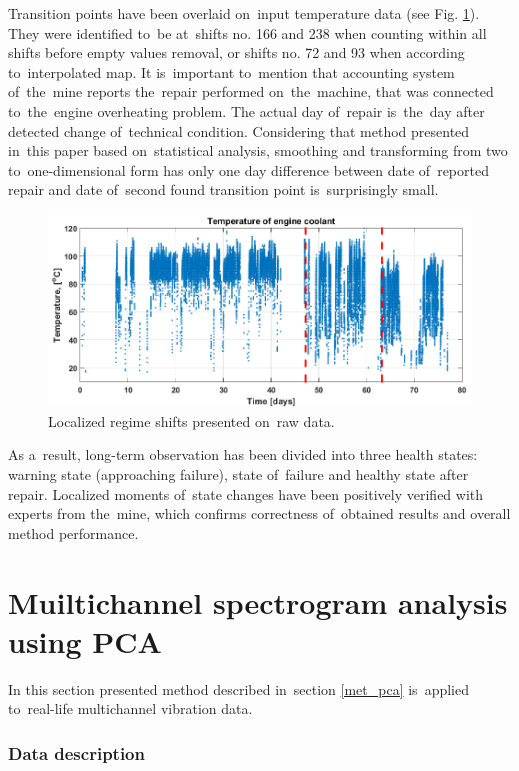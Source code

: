 Transition points have been overlaid on~input temperature data (see Fig. \ref{fig: AD_final}). They were identified to~be at~shifts no. 166 and 238 when counting within all shifts before empty values removal, or shifts no. 72 and 93 when according to~interpolated map. It is~important to~mention that accounting system of~the~mine reports the~repair performed on~the~machine, that was connected to~the~engine overheating problem. The actual day of~repair is~the~day after detected change of~technical condition. Considering that method presented in~this paper based on~statistical analysis, smoothing and transforming from two to~one-dimensional form has only one day difference between date of~reported repair and date of~second found transition point is~surprisingly small.

\begin{figure}[ht!]
\centering
\includegraphics[width = \textwidth]{wykresy/ks_final.png}
\caption{Localized regime shifts presented on~raw data.}
\label{fig: AD_final}
\end{figure}

As a~result, long-term observation has been divided into three health states: warning state (approaching failure), state of~failure and healthy state after repair. Localized moments of~state changes have been positively verified with experts from the~mine, which confirms correctness of~obtained results and overall method performance.


\clearpage
\section{Muiltichannel spectrogram analysis using PCA}\label{result_pca}

In this section presented method described in~section \ref{met_pca} is~applied to~real-life multichannel vibration data.

\subsubsection{Data description}

